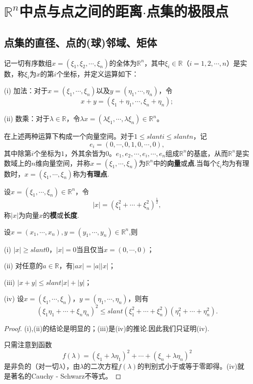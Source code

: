 \documentclass[../../main.tex]{subfiles}
\begin{document}
\section{$\mathbb{R}^n$中点与点之间的距离$\cdot$点集的极限点}

\subsection{点集的直径、点的(球)邻域、矩体}

\begin{definition}\label{definition:Rn与Rn中的运算}
  记一切有序数组\(x = (\xi_1,\xi_2,\cdots,\xi_n)\)的全体为\(\mathbb{R}^n\)，其中\(\xi_i\in\mathbb{R}\)（\(i = 1,2,\cdots,n\)）是实数，称\(\xi_i\)为\(x\)的第\(i\)个坐标，并定义运算如下：

(i) 加法：对于\(x = (\xi_1,\cdots,\xi_n)\)以及\(y = (\eta_1,\cdots,\eta_n)\)，令
\[x + y = (\xi_1+\eta_1,\cdots,\xi_n+\eta_n);\]

(ii) 数乘：对于\(\lambda\in\mathbb{R}\)，令\(\lambda x = (\lambda\xi_1,\cdots,\lambda\xi_n)\in\mathbb{R}^n\)。

在上述两种运算下构成一个向量空间。对于\(1\leqslant slant i\leqslant slant n\)，记
\[e_i = (0,\cdots,0,1,0,\cdots,0),\]
其中除第\(i\)个坐标为\(1\)，外其余皆为\(0\)。\(e_1,e_2,\cdots,e_i,\cdots,e_n\)组成\(\mathbb{R}^n\)的基底，从而\(\mathbb{R}^n\)是实数域上的\(n\)维向量空间，并称\(x = (\xi_1,\cdots,\xi_n)\)为\(\mathbb{R}^n\)中的\textbf{向量}或\textbf{点}.当每个\(\xi_i\)均为有理数时，\(x = (\xi_1,\cdots,\xi_n)\)称为\textbf{有理点}.
\end{definition}

\begin{definition}
设\(x = (\xi_1,\cdots,\xi_n)\in\mathbb{R}^n\)，令
\[|x| = (\xi_1^2+\cdots+\xi_n^2)^{\frac{1}{2}},\]
称\(|x|\)为向量\(x\)的\textbf{模}或\textbf{长度}.
\end{definition}

\begin{proposition}[向量的模的性质]\label{proposition:向量的模的性质}
设\(x=(x_1,\cdots ,x_n),y=\left( y_1,\cdots ,y_n \right) \in \mathbb{R} ^n\),则

(i) \(|x|\geqslant slant0\)，\(|x| = 0\)当且仅当\(x=(0,\cdots,0)\)；

(ii) 对任意的\(a\in\mathbb{R}\)，有\(|ax| = |a||x|\)；

(iii) \(|x + y|\leqslant slant|x|+|y|\)；

(iv) 设\(x = (\xi_1,\cdots,\xi_n)\)，\(y = (\eta_1,\cdots,\eta_n)\)，则有
\[(\xi_1\eta_1+\cdots+\xi_n\eta_n)^2\leqslant slant(\xi_1^2+\cdots+\xi_n^2)(\eta_1^2+\cdots+\eta_n^2).\]
\end{proposition}
\begin{proof}
  (i),(ii)的结论是明显的；(iii)是(iv)的推论.因此我们只证明(iv).

只需注意到函数
\[f(\lambda)=(\xi_1+\lambda\eta_1)^2+\cdots+(\xi_n+\lambda\eta_n)^2\]
是非负的（对一切\(\lambda\)），由\(\lambda\)的二次方程\(f(\lambda)\)的判别式小于或等于零即得。(iv)就是著名的Cauchy - Schwarz不等式。
\end{proof}
\end{document}
